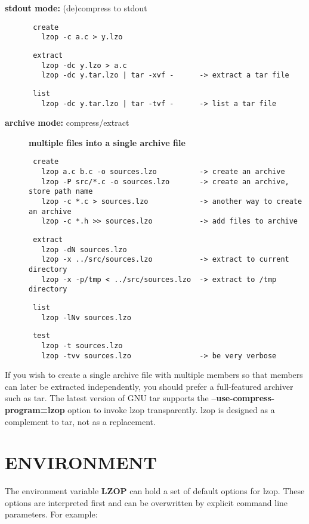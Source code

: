 \begin{description}
\item[\textbf{stdout mode:} (de)compress to stdout] \mbox{}\begin{verbatim}
 create
   lzop -c a.c > y.lzo
\end{verbatim}
\begin{verbatim}
 extract
   lzop -dc y.lzo > a.c
   lzop -dc y.tar.lzo | tar -xvf -      -> extract a tar file
\end{verbatim}
\begin{verbatim}
 list
   lzop -dc y.tar.lzo | tar -tvf -      -> list a tar file
\end{verbatim}

\item[\textbf{archive mode:} compress/extract] \textbf{multiple files into a single archive file}\begin{verbatim}
 create
   lzop a.c b.c -o sources.lzo          -> create an archive
   lzop -P src/*.c -o sources.lzo       -> create an archive, store path name
   lzop -c *.c > sources.lzo            -> another way to create an archive
   lzop -c *.h >> sources.lzo           -> add files to archive
\end{verbatim}
\begin{verbatim}
 extract
   lzop -dN sources.lzo
   lzop -x ../src/sources.lzo           -> extract to current directory
   lzop -x -p/tmp < ../src/sources.lzo  -> extract to /tmp directory
\end{verbatim}
\begin{verbatim}
 list
   lzop -lNv sources.lzo
\end{verbatim}
\begin{verbatim}
 test
   lzop -t sources.lzo
   lzop -tvv sources.lzo                -> be very verbose
\end{verbatim}
\end{description}


If you wish to create a single archive file with multiple
members so that members can later be extracted independently,
you should prefer a full-featured archiver such as
tar. The latest version of GNU tar supports the
\textbf{--use-compress-program=lzop} option to invoke lzop transparently.
lzop is designed as a complement to tar, not as
a replacement.

\section{ENVIRONMENT\label{ENVIRONMENT}}


The environment variable \textbf{LZOP} can hold a set of default
options for lzop. These options are interpreted first and
can be overwritten by explicit command line parameters.
For example:


